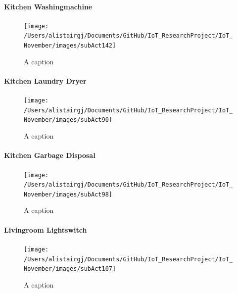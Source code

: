 \documentclass[11pt,]{article}
\let\oldparagraph\paragraph
\renewcommand{\paragraph}[1]{\oldparagraph{#1}\mbox{}}
\begin{document}
\hypertarget{kitchen-washingmachine}{%
\paragraph{Kitchen Washingmachine}\label{kitchen-washingmachine}}

\begin{figure}[H]

{\centering \texttt{[image: /Users/alistairgj/Documents/GitHub/IoT\_ResearchProject/IoT\_November/images/subAct142]} 

}

\caption{A caption}\label{fig:subAct142}
\end{figure}

\hypertarget{kitchen-laundry-dryer}{%
\paragraph{Kitchen Laundry Dryer}\label{kitchen-laundry-dryer}}

\begin{figure}[H]

{\centering \texttt{[image: /Users/alistairgj/Documents/GitHub/IoT\_ResearchProject/IoT\_November/images/subAct90]} 

}

\caption{A caption}\label{fig:subAct90}
\end{figure}

\hypertarget{kitchen-garbage-disposal}{%
\paragraph{Kitchen Garbage Disposal}\label{kitchen-garbage-disposal}}

\begin{figure}[H]

{\centering \texttt{[image: /Users/alistairgj/Documents/GitHub/IoT\_ResearchProject/IoT\_November/images/subAct98]} 

}

\caption{A caption}\label{fig:subAct98}
\end{figure}

\hypertarget{livingroom-lightswitch}{%
\paragraph{Livingroom Lightswitch}\label{livingroom-lightswitch}}

\begin{figure}[H]

{\centering \texttt{[image: /Users/alistairgj/Documents/GitHub/IoT\_ResearchProject/IoT\_November/images/subAct107]} 

}

\caption{A caption}\label{fig:subAct107}
\end{figure}
\end{document}
